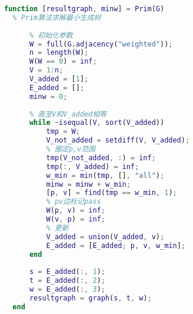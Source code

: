 \documentclass[withoutpreface]{cumcmthesis}
\begin{document}
  \begin{lstlisting}[language=matlab ,caption={} ]
  function [resultgraph, minw] = Prim(G)
  % Prim算法求解最小生成树
  
      % 初始化参数
      W = full(G.adjacency("weighted"));
      n = length(W);
      W(W == 0) = inf;
      V = 1:n;
      V_added = [1];
      E_added = [];
      minw = 0;
  
      % 直至V和V_added相等
      while ~isequal(V, sort(V_added))
          tmp = W;
          V_not_added = setdiff(V, V_added);
          % 圈定p,v范围
          tmp(V_not_added, :) = inf;
          tmp(:, V_added) = inf;
          w_min = min(tmp, [], "all");
          minw = minw + w_min;
          [p, v] = find(tmp == w_min, 1);
          % pv边标记pass
          W(p, v) = inf;
          W(v, p) = inf;
          % 更新
          V_added = union(V_added, v);
          E_added = [E_added; p, v, w_min];
      end
  
      s = E_added(:, 1);
      t = E_added(:, 2);
      w = E_added(:, 3);
      resultgraph = graph(s, t, w);
  end
  \end{lstlisting}
\end{document}
